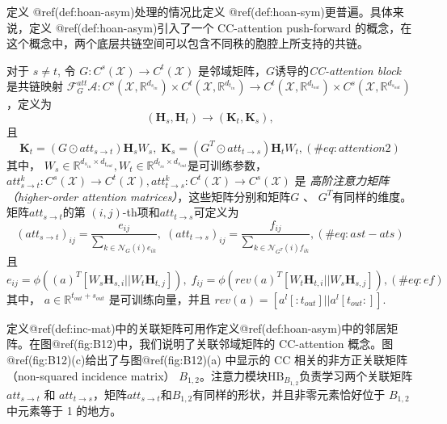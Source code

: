 \documentclass[
  12pt,
]{krantz}
\begin{document}
定义 @ref(def:hoan-asym)处理的情况比定义
@ref(def:hoan-sym)更普遍。具体来说，定义 @ref(def:hoan-asym)引入了一个
CC-attention push-forward
的概念，在这个概念中，两个底层共链空间可以包含不同秩的胞腔上所支持的共链。

\label{hoan-asym}
对于 \(s\neq t\), 令
\(G\colon C^{s}(\mathcal{X})\to C^{t}(\mathcal{X})\)
是邻域矩阵，\(G\)诱导的\emph{CC-attention block} 是共链映射
\(\mathcal{F}_{G}^{att}  {\mathcal{A}}\colon C^{s}(\mathcal{X},\mathbb{R}^{d_{s_{in}}}) \times C^{t}(\mathcal{X},\mathbb{R}^{d_{t_{in}}}) \to C^{t}(\mathcal{X},\mathbb{R}^{d_{t_{out}}}) \times C^{s}(\mathcal{X},\mathbb{R}^{d_{s_{out}}})\)，定义为
\begin{equation}
(\mathbf{H}_{s},\mathbf{H}_{t}) \to  (\mathbf{K}_{t}, \mathbf{K}_{s} ),
\end{equation} 且 \begin{equation}
\mathbf{K}_{t} = ( G \odot att_{s\to t})  \mathbf{H}_{s} W_{s} ,\;
\mathbf{K}_{s} = (G^T \odot att_{t\to s})  \mathbf{H}_{t}  W_{t} ,
(\#eq:attention2)
\end{equation} 其中，
\(W_s \in \mathbb{R}^{d_{s_{in}}\times d_{t_{out}}} , W_t \in \mathbb{R}^{d_{t_{in}}\times d_{s_{out}}}\)是可训练参数，\(att_{s\to t}^{k}\colon C^{s}(\mathcal{X})\to C^{t}(\mathcal{X}) , att_{t\to s}^{k}\colon C^{t}(\mathcal{X})\to C^{s}(\mathcal{X})\)
是 \emph{高阶注意力矩阵（higher-order attention
matrices）}，这些矩阵分别和矩阵\(G\) 、 \(G^T\)有同样的维度。
矩阵\(att_{s\to t}\)的第 \((i,j)\)-th项和\(att_{t\to s}\)可定义为
\begin{equation}
(att_{s\to t})_{ij} =  \frac{e_{ij}}{ \sum_{k \in \mathcal{N}_{G} (i) e_{ik} } },\;
(att_{t\to s})_{ij} =  \frac{f_{ij}}{ \sum_{k \in \mathcal{N}_{G^T} (i) f_{ik} } },
(\#eq:ast-ats)
\end{equation} 且 \begin{equation}
e_{ij} = \phi((a)^T [W_s \mathbf{H}_{s,i}||W_t \mathbf{H}_{t,j}] ),\;
f_{ij} = \phi(rev(a)^T [W_t \mathbf{H}_{t,i}||W_s \mathbf{H}_{s,j}]),
(\#eq:ef)
\end{equation} 其中， \(a \in \mathbb{R}^{t_{out} + s_{out}}\)
是可训练向量，并且 \(rev(a)= [ a^l[:t_{out}]||a^l[t_{out}:]]\).

定义@ref(def:inc-mat)中的关联矩阵可用作定义@ref(def:hoan-asym)中的邻居矩阵。在图@ref(fig:B12)中，我们说明了关联邻域矩阵的
CC-attention 概念。图@ref(fig:B12)(c)给出了与图@ref(fig:B12)(a) 中显示的
CC 相关的非方正关联矩阵（non-squared incidence matrix）
\(B_{1,2}\)。注意力模块\(\mbox{HB}_{B_{1,2}}\)负责学习两个关联矩阵\(att_{s\to t}\)
和
\(att_{t\to s}\)，矩阵\(att_{s\to t}\)和\(B_{1,2}\)有同样的形状，并且非零元素恰好位于
\(B_{1,2}\) 中元素等于 1 的地方。
\end{document}

